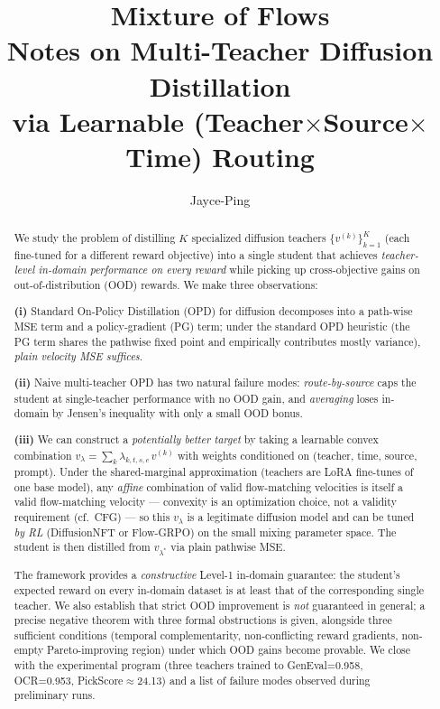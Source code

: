 \documentclass[11pt,a4paper]{article}
\title{\textbf{Mixture of Flows}\\[0.3em]
\large Notes on Multi-Teacher Diffusion Distillation\\
via Learnable (Teacher$\times$Source$\times$Time) Routing}
\author{Jayce-Ping}
\date{}
\theoremstyle{definition}
\begin{document}
\maketitle

\begin{abstract}
We study the problem of distilling $K$ specialized diffusion teachers
$\{v^{(k)}\}_{k=1}^K$ (each fine-tuned for a different reward objective)
into a single student that achieves \emph{teacher-level in-domain performance
on every reward} while picking up cross-objective gains on out-of-distribution
(OOD) rewards. We make three observations:

\textbf{(i)} Standard On-Policy Distillation (OPD) for diffusion decomposes
into a path-wise MSE term and a policy-gradient (PG) term; under the
standard OPD heuristic (the PG term shares the pathwise fixed point and
empirically contributes mostly variance), \emph{plain velocity MSE
suffices}.

\textbf{(ii)} Naive multi-teacher OPD has two natural failure modes:
\emph{route-by-source} caps the student at single-teacher performance with no
OOD gain, and \emph{averaging} loses in-domain by Jensen's inequality with
only a small OOD bonus.

\textbf{(iii)} We can construct a \emph{potentially better target} by taking a learnable
convex combination $v_\lambda = \sum_k \lambda_{k,t,s,c}\,v^{(k)}$ with weights
conditioned on (teacher, time, source, prompt). Under the shared-marginal
approximation (teachers are LoRA fine-tunes of one base model), any
\emph{affine} combination of valid flow-matching velocities is itself a
valid flow-matching velocity — convexity is an optimization choice, not a
validity requirement (cf.\ CFG) — so this $v_\lambda$ is a legitimate
diffusion model and can be tuned
\emph{by RL} (DiffusionNFT or Flow-GRPO) on the small mixing parameter space.
The student is then distilled from $v_{\lambda^*}$ via plain pathwise MSE.

The framework provides a \emph{constructive} Level-1 in-domain guarantee:
the student's expected reward on every in-domain dataset is at least that
of the corresponding single teacher. We also establish that strict OOD
improvement is \emph{not} guaranteed in general; a precise negative theorem
with three formal obstructions is given, alongside three sufficient
conditions (temporal complementarity, non-conflicting reward gradients,
non-empty Pareto-improving region) under which OOD gains become provable.
We close with the experimental program (three teachers trained to
GenEval=0.958, OCR=0.953, PickScore$\approx$24.13) and a list of failure
modes observed during preliminary runs.
\end{abstract}
\end{document}
